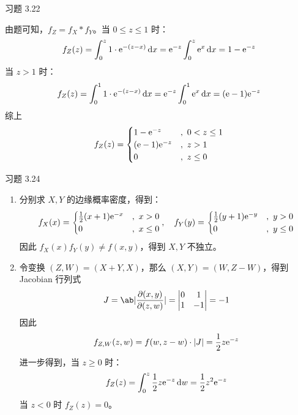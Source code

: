 \begin{problem}
    习题 3.22
    \begin{solution}
        由题可知，$f_Z = f_X * f_Y$。当 $0 \le z \le 1$ 时：
        $$
        f_Z(z) = \int_{0}^{z} 1 \cdot \mathrm{e}^{-(z - x)} \dd{x} = \mathrm{e}^{-z} \int_{0}^{z} \mathrm{e}^{x} \dd{x} = 1 - \mathrm{e}^{-z}
        $$
        当 $z > 1$ 时：
        $$
        f_Z(z) = \int_{0}^{1} 1 \cdot \mathrm{e}^{-(z - x)} \dd{x} = \mathrm{e}^{-z} \int_{0}^{1} \mathrm{e}^{x} \dd{x} = (\mathrm{e} - 1) \mathrm{e}^{-z}
        $$
        综上
        $$
        f_Z(z) = \begin{cases}
            1 - \mathrm{e}^{-z} &,\ 0 < z \le 1 \\
            (\mathrm{e} - 1) \mathrm{e}^{-z} &,\ z > 1 \\
            0 &,\ z \le 0
        \end{cases}
        $$
    \end{solution}
\end{problem}

\begin{problem}
    习题 3.24
    \begin{solution}
        \begin{enumerate}
            \item[\textbf{1)}] 分别求 $X, Y$ 的边缘概率密度，得到：
            $$
            \begin{gathered}
                f_X(x) = \begin{cases}
                    \frac{1}{2} (x + 1) \mathrm{e}^{-x} &,\ x > 0 \\
                    0 &,\ x \le 0
                \end{cases}, \quad f_Y(y) = \begin{cases}
                    \frac{1}{2} (y + 1) \mathrm{e}^{-y} &,\ y > 0 \\
                    0 &,\ y \le 0
                \end{cases}
            \end{gathered}
            $$
            因此 $f_X(x) f_Y(y) \neq f(x, y)$，得到 $X, Y$ 不独立。

            \item[\textbf{2)}] 令变换 $(Z, W) = (X + Y, X)$，那么 $(X, Y) = (W, Z - W)$，得到 Jacobian 行列式
            $$
            J = \ab|\frac{\partial(x, y)}{\partial(z, w)}| = \begin{vmatrix}
                0 & 1 \\
                1 & -1
            \end{vmatrix} = -1
            $$
            因此
            $$
            f_{Z, W}(z, w) = f(w, z - w) \cdot \abs{J} = \frac{1}{2} z \mathrm{e}^{-z}
            $$
            进一步得到，当 $z \ge 0$ 时：
            $$
            f_Z(z) = \int_{0}^{z} \frac{1}{2} z \mathrm{e}^{-z} \dd{w} = \frac{1}{2} z^2 \mathrm{e}^{-z}
            $$
            当 $z < 0$ 时 $f_Z(z) = 0$。
        \end{enumerate}
    \end{solution}
\end{problem}

